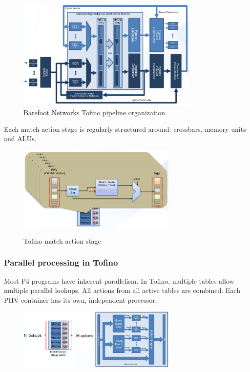 \documentclass[11pt,oneside,a4paper]{article}
\begin{document}
\begin{figure}[b!]
	\centering
	\includegraphics[width=0.8\textwidth,scale=1]{figures/tofino_pipeline}
	\caption{Barefoot Networks Tofino pipeline organization \cite{barefoot}}
	\label{fig:tofino_pipeline}
\end{figure}

\newpage

\noindent Each match action stage is regularly structured around: crossbars, memory units and ALUs.

\begin{figure}[hb]
	\centering
	\includegraphics[width=0.7\textwidth,scale=1]{figures/tofino_match_action_stage}
	\label{fig:tofino_match_action_stage}
	\caption{Tofino match action stage \cite{barefoot}}
\end{figure}

\subsubsection{Parallel processing in Tofino}

Most P4 programs have inherent parallelism. In Tofino, multiple tables allow multiple parallel lookups. All actions from all active tables are combined. Each PHV container has its own, independent processor.

\begin{figure}[hb]
	\centering
	\includegraphics[width=0.7\textwidth,scale=1]{figures/tofino_parallelism}
	\label{fig:tofino_parallelism}
\end{figure}
\end{document}
